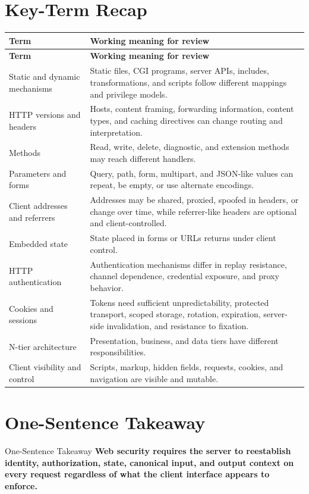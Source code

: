\documentclass[11pt,letterpaper]{article}
\begin{document}
\section{Key-Term Recap}
\begin{longtable}{>{\raggedright\arraybackslash}p{}p{}}
\toprule
\textbf{Term} & \textbf{Working meaning for review} \\
\midrule
\endfirsthead
\toprule
\textbf{Term} & \textbf{Working meaning for review} \\
\midrule
\endhead
Static and dynamic mechanisms & Static files, CGI programs, server APIs, includes, transformations, and scripts follow different mappings and privilege models. \\
HTTP versions and headers & Hosts, content framing, forwarding information, content types, and caching directives can change routing and interpretation. \\
Methods & Read, write, delete, diagnostic, and extension methods may reach different handlers. \\
Parameters and forms & Query, path, form, multipart, and JSON-like values can repeat, be empty, or use alternate encodings. \\
Client addresses and referrers & Addresses may be shared, proxied, spoofed in headers, or change over time, while referrer-like headers are optional and client-controlled. \\
Embedded state & State placed in forms or URLs returns under client control. \\
HTTP authentication & Authentication mechanisms differ in replay resistance, channel dependence, credential exposure, and proxy behavior. \\
Cookies and sessions & Tokens need sufficient unpredictability, protected transport, scoped storage, rotation, expiration, server-side invalidation, and resistance to fixation. \\
N-tier architecture & Presentation, business, and data tiers have different responsibilities. \\
Client visibility and control & Scripts, markup, hidden fields, requests, cookies, and navigation are visible and mutable. \\
\bottomrule
\end{longtable}
\section{One-Sentence Takeaway}
\begin{CornellExamBox}{One-Sentence Takeaway}
\textbf{Web security requires the server to reestablish identity, authorization, state, canonical input, and output context on every request regardless of what the client interface appears to enforce.}
\end{CornellExamBox}
\end{document}
